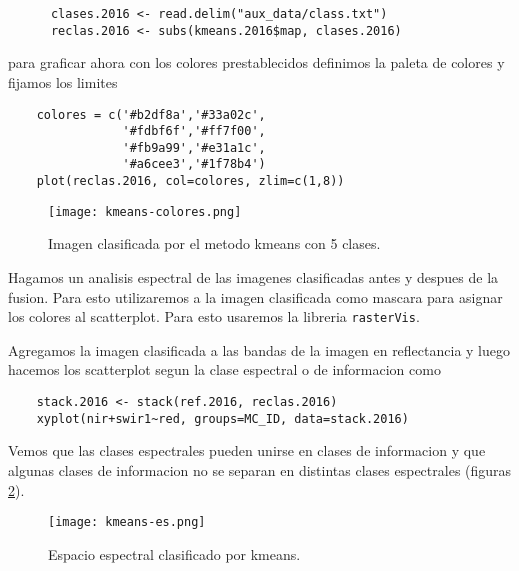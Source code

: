 \begin{exa}
  \begin{lstlisting}
      clases.2016 <- read.delim("aux_data/class.txt")
      reclas.2016 <- subs(kmeans.2016$map, clases.2016)
  \end{lstlisting}

  para graficar ahora con los colores prestablecidos definimos la paleta de colores y fijamos los limites

  \begin{lstlisting}
    colores = c('#b2df8a','#33a02c',
                '#fdbf6f','#ff7f00',
                '#fb9a99','#e31a1c',
                '#a6cee3','#1f78b4')
    plot(reclas.2016, col=colores, zlim=c(1,8))
  \end{lstlisting}
  \begin{figure}[h!]
    \centering
    \texttt{[image: kmeans-colores.png]}
    \caption{Imagen clasificada por el metodo kmeans con 5 clases.}
    \label{fig:kmean5}
  \end{figure}
\end{exa}

\begin{exa}
  Hagamos un analisis espectral de las imagenes clasificadas antes y despues de la fusion.
  Para esto utilizaremos a la imagen clasificada como mascara para asignar los colores
  al scatterplot. Para esto usaremos la libreria \texttt{rasterVis}.

  Agregamos la imagen clasificada a las bandas de la imagen en reflectancia y luego
  hacemos los scatterplot segun la clase espectral o de informacion como

  \begin{lstlisting}
    stack.2016 <- stack(ref.2016, reclas.2016)
    xyplot(nir+swir1~red, groups=MC_ID, data=stack.2016)
  \end{lstlisting}
  Vemos que las clases espectrales pueden unirse en clases de informacion y que algunas clases de informacion no se separan en distintas clases espectrales (figuras \ref{fig:esk}).
  \begin{figure}[h!]
    \centering
    \texttt{[image: kmeans-es.png]}
    \caption{Espacio espectral clasificado por kmeans.}
    \label{fig:esk}
  \end{figure}

\end{exa}

